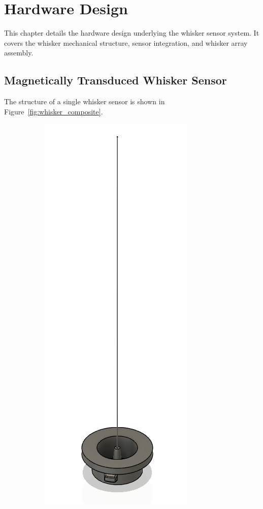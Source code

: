 

\chapter{Hardware Design}

This chapter details the hardware design underlying the whisker sensor system.
It covers the whisker mechanical structure, sensor integration, and whisker array assembly.


\section{Magnetically Transduced Whisker Sensor}
The structure of a single whisker sensor is shown in Figure~\ref{fig:whisker_composite}.

\begin{figure}[ht]
    \centering
    \begin{subfigure}[b]{0.31\textwidth}
        \centering
        \includegraphics[height=0.2\textheight]{figures/whisker}

\end{subfigure}
\end{figure}
